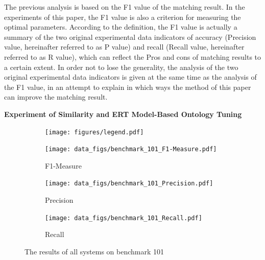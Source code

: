 \documentclass[twoside]{article}
\begin{document}
The previous analysis is based on the F1 value of the matching result. In the experiments of this paper, the F1 value is also a criterion for measuring the optimal parameters.
According to the definition, the F1 value is actually a summary of the two original experimental data indicators of accuracy (Precision value, hereinafter referred to as P value) and recall (Recall value, hereinafter referred to as R value), which can reflect the Pros and cons of matching results to a certain extent.
In order not to lose the generality,  the analysis of the two original experimental data indicators is given at the same time as the analysis of the F1 value, in an attempt to explain in which ways the method of this paper can improve the matching result.

{\bf Experiment of Similarity and ERT Model-Based Ontology Tuning}

\begin{figure}[htb!]\centering
\begin{subfigure}{\textwidth}
	\centering
\texttt{[image: figures/legend.pdf]}
\end{subfigure}
\begin{subfigure}{0.5\textwidth}
	\centering
\texttt{[image: data\_figs/benchmark\_101\_F1-Measure.pdf]}
\caption{F1-Measure}
\label{fig:benchmark_101_F1-Measure}
\end{subfigure}
\begin{subfigure}{0.3\textwidth}
	\centering
\texttt{[image: data\_figs/benchmark\_101\_Precision.pdf]}
\caption{Precision}
\label{fig:benchmark_101_Precision}
\end{subfigure}
\begin{subfigure}{0.3\textwidth}
	\centering
\texttt{[image: data\_figs/benchmark\_101\_Recall.pdf]}
\caption{Recall}
\label{fig:benchmark_101_Recall}
\end{subfigure}
\caption{The results of all systems on benchmark 101}
\end{figure}
\end{document}
